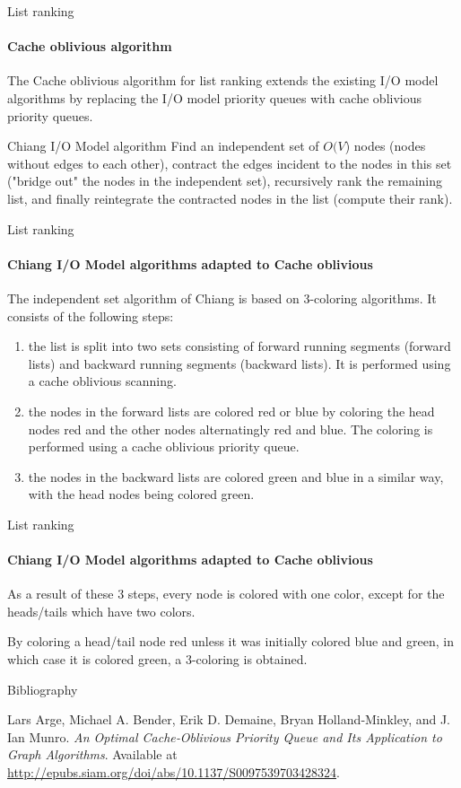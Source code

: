 \documentclass{beamer}
\begin{document}
\begin{darkframes}
    \begin{frame}{List ranking}
    \framesubtitle{Cache oblivious algorithm}
    The Cache oblivious algorithm for list ranking extends the existing I/O model algorithms by replacing the I/O model priority queues with cache oblivious priority queues.
    \bigskip
    \begin{block}{Chiang I/O Model algorithm}
    Find an independent set of \(O(V\)) nodes (nodes without edges
to each other), contract the edges incident to the nodes in
this set ("bridge out" the nodes in the independent set),
recursively rank the remaining list, and finally reintegrate the contracted nodes in the list (compute their rank).
    \end{block}
    \end{frame}
    
    \begin{frame}{List ranking}
    \framesubtitle{Chiang I/O Model algorithms adapted to Cache oblivious}
    The independent set algorithm of Chiang is
based on 3-coloring algorithms. It consists of the following steps:
    \begin{enumerate}
    \item the list is split into two sets consisting
of forward running segments (forward lists) and backward
running segments (backward lists). It is performed using a cache oblivious scanning.
	\item the nodes in the forward lists are colored red or blue by coloring the head nodes red and the other nodes alternatingly red and blue. The coloring is performed using a cache oblivious priority queue.
    \item the nodes in the backward lists are colored green and blue in a similar way, with the head nodes being colored green.
    \end{enumerate}
    \end{frame}
    
    \begin{frame}{List ranking}
    \framesubtitle{Chiang I/O Model algorithms adapted to Cache oblivious}
    As a result of these 3 steps, every node is colored with one color, except for the heads/tails which have two colors. 
    \bigskip
    
    By coloring a head/tail node red unless it was initially colored blue and green, in which case it is colored green, a 3-coloring is obtained.
    \end{frame}

    \begin{frame}[label=bibliography]{Bibliography}
      \begin{thebibliography}{9}
            Lars Arge, Michael A. Bender, Erik D. Demaine, Bryan Holland‐Minkley, and J. Ian Munro.
            \emph{An Optimal Cache‐Oblivious Priority Queue and Its Application to Graph Algorithms}.
            Available at \url{http://epubs.siam.org/doi/abs/10.1137/S0097539703428324}.
      \end{thebibliography}
    \end{frame}
  \end{darkframes}
\end{document}
